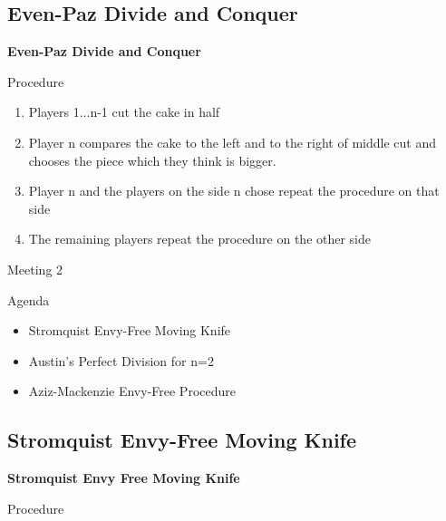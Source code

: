\documentclass[aspectratio=169,xcolor=dvipsnames]{beamer}
\begin{document}
\subsection{Even-Paz Divide and Conquer}
\begin{frame}
	\Huge{\centerline{\textbf{Even-Paz Divide and Conquer}}}
\end{frame}
\begin{frame}{Procedure}
	\begin{enumerate}
		\item Players 1...n-1 cut the cake in half
		\item Player n compares the cake to the left and to the right of middle cut and chooses the piece which they think is bigger.\pause
		\item Player n and the players on the side n chose repeat the procedure on that side
		\item The remaining players repeat the procedure on the other side
	\end{enumerate}
\end{frame}
\begin{frame}{Meeting 2}
	\begin{block}{Agenda}
		\begin{itemize}
			\item Stromquist Envy-Free Moving Knife
			\item Austin's Perfect Division for n=2
			\item Aziz-Mackenzie Envy-Free Procedure
		\end{itemize}
	\end{block}
\end{frame}
\subsection{Stromquist Envy-Free Moving Knife}
\begin{frame}
\Huge{\centerline{\textbf{Stromquist Envy Free Moving Knife}}}
\end{frame}
\begin{frame}{Procedure}
\end{frame}
\end{document}
